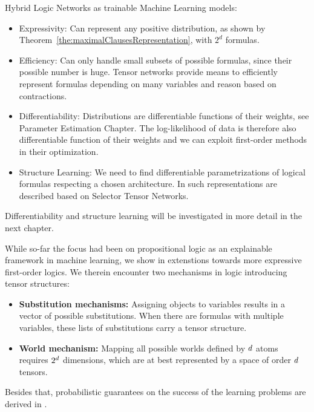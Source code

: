 Hybrid Logic Networks as trainable Machine Learning models:
\begin{itemize}
    \item Expressivity: Can represent any positive distribution, as shown by Theorem~\ref{the:maximalClausesRepresentation}, with $2^d$ formulas.
    \item Efficiency: Can only handle small subsets of possible formulas, since their possible number is huge.
    Tensor networks provide means to efficiently represent formulas depending on many variables and reason based on contractions.
    \item Differentiability: Distributions are differentiable functions of their weights, see Parameter Estimation Chapter.
    The log-likelihood of data is therefore also differentiable function of their weights and we can exploit first-order methods in their optimization.
    \item Structure Learning: We need to find differentiable parametrizations of logical formulas respecting a chosen architecture.
    In  such representations are described based on Selector Tensor Networks.
\end{itemize}
Differentiability and structure learning will be investigated in more detail in the next chapter.




While so-far the focus had been on propositional logic as an explainable framework in machine learning, we show in  extenstions towards more expressive first-order logics.
We therein encounter two mechanisms in logic introducing tensor structures:
\begin{itemize}
    \item \textbf{Substitution mechanisms:} Assigning objects to variables results in a vector of possible substitutions. When there are formulas with multiple variables, these lists of substitutions carry a tensor structure.
    \item \textbf{World mechanism:} Mapping all possible worlds defined by $d$ atoms requires $2^{d}$ dimensions, which are at best represented by a space of order $d$ tensors.
\end{itemize}


Besides that, probabilistic guarantees on the success of the learning problems are derived in .